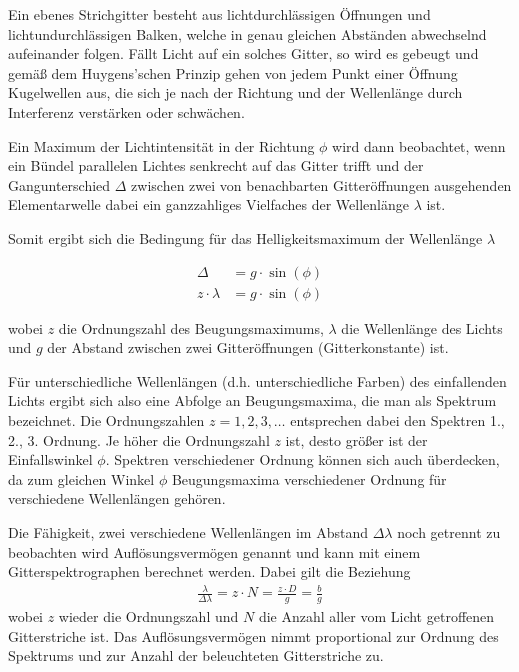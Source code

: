 \documentclass{article}
\begin{document}
Ein ebenes Strichgitter besteht aus lichtdurchlässigen Öffnungen und lichtundurchlässigen Balken, welche in genau gleichen Abständen abwechselnd aufeinander folgen. Fällt Licht auf ein solches Gitter, so wird es gebeugt und gemäß dem Huygens'schen Prinzip gehen von jedem Punkt einer Öffnung Kugelwellen aus, die sich je nach der Richtung und der Wellenlänge durch Interferenz verstärken oder schwächen.

Ein Maximum der Lichtintensität in der Richtung $\phi$ wird dann beobachtet, wenn ein Bündel parallelen Lichtes senkrecht auf das Gitter trifft und der Gangunterschied $\Delta$ zwischen zwei von benachbarten Gitteröffnungen ausgehenden Elementarwelle dabei ein ganzzahliges Vielfaches der Wellenlänge $\lambda$ ist.

Somit ergibt sich die Bedingung für das Helligkeitsmaximum der Wellenlänge $\lambda$

\begin{align}
\Delta &= g\cdot \sin(\phi) \\
\label{eq:gitterkonst}
z\cdot \lambda &= g\cdot \sin(\phi)
\end{align}

wobei $z$ die Ordnungszahl des Beugungsmaximums, $\lambda$ die Wellenlänge des Lichts und $g$ der Abstand zwischen zwei Gitteröffnungen (Gitterkonstante) ist.

Für unterschiedliche Wellenlängen (d.h. unterschiedliche Farben) des einfallenden Lichts ergibt sich also eine Abfolge an Beugungsmaxima, die man als Spektrum bezeichnet. Die Ordnungszahlen $z = 1,2,3, \dots$ entsprechen dabei den Spektren 1., 2., 3. Ordnung. Je höher die Ordnungszahl $z$ ist, desto größer ist der Einfallswinkel $\phi$. Spektren verschiedener Ordnung können sich auch überdecken, da zum gleichen Winkel $\phi$ Beugungsmaxima verschiedener Ordnung für verschiedene Wellenlängen gehören.



Die Fähigkeit, zwei verschiedene Wellenlängen im Abstand $\Delta\lambda$ noch getrennt zu beobachten wird Auflösungsvermögen genannt und kann mit einem Gitterspektrographen berechnet werden. Dabei gilt die Beziehung
\begin{align}
\label{eq:aufl_gitter}
\frac{\lambda}{\Delta \lambda} = z\cdot N = \frac{z\cdot D}{g} =  \frac{b}{g}
\end{align}
wobei $z$ wieder die Ordnungszahl und $N$ die Anzahl aller vom Licht getroffenen Gitterstriche ist. Das Auflösungsvermögen nimmt proportional zur Ordnung des Spektrums und zur Anzahl der beleuchteten Gitterstriche zu.
\end{document}
